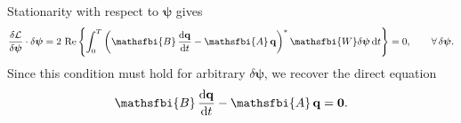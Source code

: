 \begin{appendices}
Stationarity with respect to \(\boldsymbol{\psi}\) gives
\begin{equation}
  \frac{\delta \mathcal{L}}{\delta \boldsymbol{\psi}}\cdot\delta\boldsymbol{\psi}
  =
  2\,\operatorname{Re}
  \left\{
    \int_{0}^{T}
      \left(
        \mathsfbi{B}\,\frac{\mathrm{d}\mathbf{q}}{\mathrm{d}t}
        -
        \mathsfbi{A}\,\mathbf{q}
      \right)^{*}
      \mathsfbi{W}\delta\boldsymbol{\psi}
    \,\mathrm{d}t
  \right\}
  =
  0,
  \qquad
  \forall\,\delta\boldsymbol{\psi}.
  \label{eq:loop_variation_psi}
\end{equation}
Since this condition must hold for arbitrary \(\delta\boldsymbol{\psi}\), we recover the direct equation
\begin{equation}
  \mathsfbi{B}\,\frac{\mathrm{d}\mathbf{q}}{\mathrm{d}t}
  -
  \mathsfbi{A}\,\mathbf{q}
  =
  \mathbf{0}.
  \label{eq:loop_recovered_direct_equation}
\end{equation}


\end{appendices}
